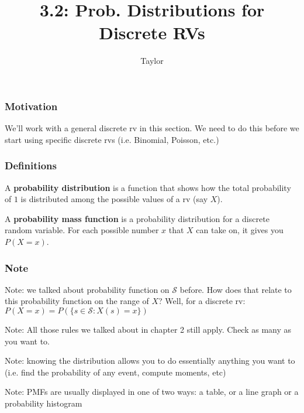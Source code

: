 \documentclass{beamer}
\title["3.2"]{3.2: Prob. Distributions for Discrete RVs}
\author{Taylor}
\institute[UVA] 
{
University of Virginia \\
\medskip
\textit{} 
}
\date{}
\begin{document}

\begin{frame}
\titlepage 
\end{frame}

\begin{frame}
\frametitle{Motivation}

We'll work with a general discrete rv in this section. We need to do this before we start using specific discrete rvs (i.e. Binomial, Poisson, etc.)

\end{frame}

\begin{frame}
\frametitle{Definitions}

A \textbf{probability distribution} is a function that shows how the total probability of $1$ is distributed among the possible values of a rv (say $X$).
\newline

A \textbf{probability mass function} is a probability distribution for a discrete random variable. For each possible number $x$ that $X$ can take on, it gives you $P(X=x)$.
\newline



\end{frame}

\begin{frame}
\frametitle{Note}

Note: we talked about probability function on $\mathcal{S}$ before. How does that relate to this probability function on the range of $X$? Well, for a discrete rv: $P(X=x) = P(\{s \in \mathcal{S} : X(s) = x\})$
\newline

Note: All those rules we talked about in chapter 2 still apply. Check as many as you want to. 
\newline

Note: knowing the distribution allows you to do essentially anything you want to (i.e. find the probability of any event, compute moments, etc)
\newline

Note: PMFs are usually displayed in one of two ways: a table, or a line graph or a probability histogram


\end{frame}
\end{document}
